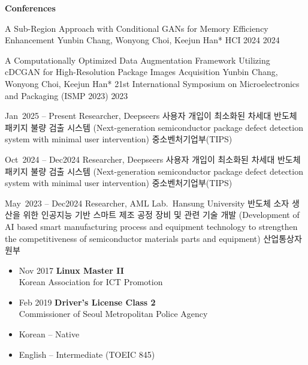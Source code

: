 \documentclass[10pt, a4paper]{cvhari}
\begin{document}
    
\textbf{Conferences}\\
\begin{itemize}
  \conferenceentry
    {A Sub-Region Approach with Conditional GANs for Memory Efficiency Enhancement}
    {Yunbin Chang, Wonyong Choi, Keejun Han*}
    {HCI 2024}
    {2024}

    \par
    \smallskip 
    \dividergray
    \smallskip

  \conferenceentry
    {A Computationally Optimized Data Augmentation Framework Utilizing cDCGAN for High-Resolution Package Images Acquisition}
    {Yunbin Chang, Wonyong Choi, Keejun Han*}
    {21st International Symposium on Microelectronics and Packaging (ISMP 2023)}
    {2023}
\end{itemize}

\bigskip

  \researchentry
    {Jan~2025 -- Present}
    {Researcher, Deepseers}
    {사용자 개입이 최소화된 차세대 반도체 패키지 불량 검출 시스템}
    {(Next-generation semiconductor package defect detection system with minimal user intervention)}
    {중소벤처기업부(TIPS)}

  \par
  \smallskip 
  \dividergray
  \smallskip
  
  \researchentry
    {Oct~2024 -- Dec2024}
    {Researcher, Deepseers}
    {사용자 개입이 최소화된 차세대 반도체 패키지 불량 검출 시스템}
    {(Next-generation semiconductor package defect detection system with minimal user intervention)}
    {중소벤처기업부(TIPS)}

  \par
  \smallskip 
  \dividergray
  \smallskip

  \researchentry
    {May~2023 -- Dec2024}
    {Researcher, AML Lab.\ Hansung University}
    {반도체 소자 생산을 위한 인공지능 기반 스마트 제조 공정 장비 및 관련 기술 개발}
    {(Development of AI based smart manufacturing process and equipment technology to strengthen the competitiveness of semiconductor materials parts and equipment)}
    {산업통상자원부}

\bigskip

\begin{itemize}
  \item Nov 2017 \textbf{Linux Master II} \\
        Korean Association for ICT Promotion
  \bigskip
  \item Feb 2019 \textbf{Driver's License Class 2} \\
        Commissioner of Seoul Metropolitan Police Agency
\end{itemize}

\bigskip

\begin{itemize}
  \item Korean – Native
  \item English – Intermediate (TOEIC 845)
\end{itemize}
\end{document}
